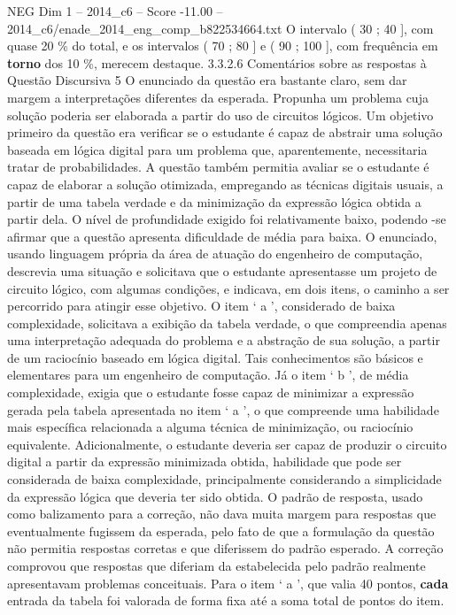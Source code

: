 \begin{textsample}{NEG Dim 1 – 2014\_c6 – Score -11.00 – 2014\_c6/enade\_2014\_eng\_comp\_b822534664.txt}
O intervalo ( 30 ; 40 ], com quase 20 \% do total, e os intervalos ( 70 ; 80 ] e ( 90 ; 100 ], com frequência em \textbf{torno} dos 10 \%, merecem destaque. 3.3.2.6 Comentários sobre as respostas à Questão Discursiva 5 O enunciado da questão era bastante claro, sem dar margem a interpretações diferentes da esperada.
Propunha um problema cuja solução poderia ser elaborada a partir do uso de circuitos lógicos.
Um objetivo primeiro da questão era verificar se o estudante é capaz de abstrair uma solução baseada em lógica digital para um problema que, aparentemente, necessitaria tratar de probabilidades.
A questão também permitia avaliar se o estudante é capaz de elaborar a solução otimizada, empregando as técnicas digitais usuais, a partir de uma tabela verdade e da minimização da expressão lógica obtida a partir dela.
O nível de profundidade exigido foi relativamente baixo, podendo -se afirmar que a questão apresenta dificuldade de média para baixa.
O enunciado, usando linguagem própria da área de atuação do engenheiro de computação, descrevia uma situação e solicitava que o estudante apresentasse um projeto de circuito lógico, com algumas condições, e indicava, em dois itens, o caminho a ser percorrido para atingir esse objetivo.
O item ‘ a ’, considerado de baixa complexidade, solicitava a exibição da tabela verdade, o que compreendia apenas uma interpretação adequada do problema e a abstração de sua solução, a partir de um raciocínio baseado em lógica digital.
Tais conhecimentos são básicos e elementares para um engenheiro de computação.
Já o item ‘ b ’, de média complexidade, exigia que o estudante fosse capaz de minimizar a expressão gerada pela tabela apresentada no item ‘ a ’, o que compreende uma habilidade mais específica relacionada a alguma técnica de minimização, ou raciocínio equivalente.
Adicionalmente, o estudante deveria ser capaz de produzir o circuito digital a partir da expressão minimizada obtida, habilidade que pode ser considerada de baixa complexidade, principalmente considerando a simplicidade da expressão lógica que deveria ter sido obtida.
O padrão de resposta, usado como balizamento para a correção, não dava muita margem para respostas que eventualmente fugissem da esperada, pelo fato de que a formulação da questão não permitia respostas corretas e que diferissem do padrão esperado.
A correção comprovou que respostas que diferiam da estabelecida pelo padrão realmente apresentavam problemas conceituais.
Para o item ‘ a ’, que valia 40 pontos, \textbf{cada} entrada da tabela foi valorada de forma fixa até a soma total de pontos do item.

\end{textsample}
